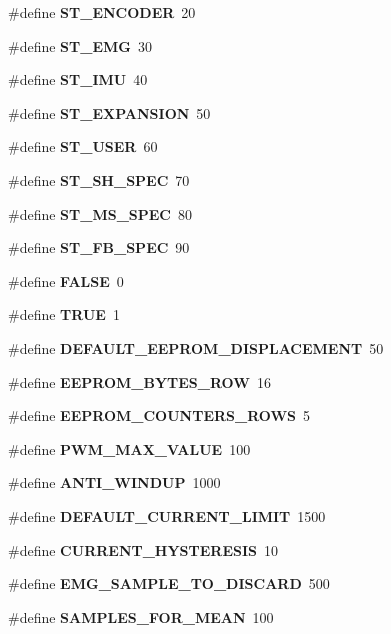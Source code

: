 \begin{DoxyCompactItemize}
\mbox{\label{globals_8h_a642639720f787f90dab85f94d4be660c}} 
\#define {\bfseries S\+T\+\_\+\+E\+N\+C\+O\+D\+ER}~20
\item 
\mbox{\label{globals_8h_afca454140c3233621eaa719a25a1c4b5}} 
\#define {\bfseries S\+T\+\_\+\+E\+MG}~30
\item 
\mbox{\label{globals_8h_a6f71b4081fa44d0458fa27e891527315}} 
\#define {\bfseries S\+T\+\_\+\+I\+MU}~40
\item 
\mbox{\label{globals_8h_a3aacefdd9f8dddbb7b55bcd39bf22792}} 
\#define {\bfseries S\+T\+\_\+\+E\+X\+P\+A\+N\+S\+I\+ON}~50
\item 
\mbox{\label{globals_8h_a16d74d98ce4fcdfb20501e89e37ff053}} 
\#define {\bfseries S\+T\+\_\+\+U\+S\+ER}~60
\item 
\mbox{\label{globals_8h_a788bae111bb48b9aa005ecf765ce1e94}} 
\#define {\bfseries S\+T\+\_\+\+S\+H\+\_\+\+S\+P\+EC}~70
\item 
\mbox{\label{globals_8h_a09fa5a059f637c6e635e27cbb1b437f8}} 
\#define {\bfseries S\+T\+\_\+\+M\+S\+\_\+\+S\+P\+EC}~80
\item 
\mbox{\label{globals_8h_aad8e3965151790073226b9ec124c0808}} 
\#define {\bfseries S\+T\+\_\+\+F\+B\+\_\+\+S\+P\+EC}~90
\item 
\mbox{\label{globals_8h_aa93f0eb578d23995850d61f7d61c55c1}} 
\#define {\bfseries F\+A\+L\+SE}~0
\item 
\mbox{\label{globals_8h_aa8cecfc5c5c054d2875c03e77b7be15d}} 
\#define {\bfseries T\+R\+UE}~1
\item 
\#define \textbf{ D\+E\+F\+A\+U\+L\+T\+\_\+\+E\+E\+P\+R\+O\+M\+\_\+\+D\+I\+S\+P\+L\+A\+C\+E\+M\+E\+NT}~50
\item 
\#define \textbf{ E\+E\+P\+R\+O\+M\+\_\+\+B\+Y\+T\+E\+S\+\_\+\+R\+OW}~16
\item 
\#define \textbf{ E\+E\+P\+R\+O\+M\+\_\+\+C\+O\+U\+N\+T\+E\+R\+S\+\_\+\+R\+O\+WS}~5
\item 
\#define \textbf{ P\+W\+M\+\_\+\+M\+A\+X\+\_\+\+V\+A\+L\+UE}~100
\item 
\#define \textbf{ A\+N\+T\+I\+\_\+\+W\+I\+N\+D\+UP}~1000
\item 
\#define \textbf{ D\+E\+F\+A\+U\+L\+T\+\_\+\+C\+U\+R\+R\+E\+N\+T\+\_\+\+L\+I\+M\+IT}~1500
\item 
\#define \textbf{ C\+U\+R\+R\+E\+N\+T\+\_\+\+H\+Y\+S\+T\+E\+R\+E\+S\+IS}~10
\item 
\#define \textbf{ E\+M\+G\+\_\+\+S\+A\+M\+P\+L\+E\+\_\+\+T\+O\+\_\+\+D\+I\+S\+C\+A\+RD}~500
\item 
\#define \textbf{ S\+A\+M\+P\+L\+E\+S\+\_\+\+F\+O\+R\+\_\+\+M\+E\+AN}~100

\end{DoxyCompactItemize}
